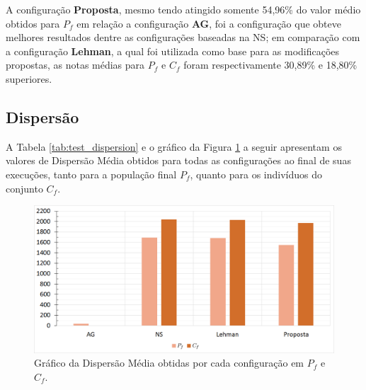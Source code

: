 A configuração \textbf{Proposta}, mesmo tendo atingido somente 54,96\% do valor médio obtidos para $P_f$ em relação a configuração \textbf{AG}, foi a configuração que obteve melhores resultados dentre as configurações baseadas na NS; em comparação com a configuração \textbf{Lehman}, a qual foi utilizada como base para as modificações propostas, as notas médias para $P_f$ e $C_f$ foram respectivamente 30,89\% e 18,80\% superiores.

\subsection{Dispersão}
\label{metrica_dispersao}

A Tabela \ref{tab:test_dispersion} e o gráfico da Figura \ref{fig:test_dispersion} a seguir apresentam os valores de Dispersão Média obtidos para todas as configurações ao final de suas execuções, tanto para a população final $P_f$, quanto para os indivíduos do conjunto $C_f$.

\begin{table}[htb]
\centering
\caption{Valores obtidos por cada configuração para Dispersão Média em $P_f$ e $C_f$.}
\label{tab:test_dispersion}
\end{table}

\begin{figure}[htb]
	\begin{center}
		\includegraphics[width=1\textwidth]{Imagens/test_dispersion.png}
		\caption{Gráfico da Dispersão Média obtidas por cada configuração em $P_f$ e $C_f$.}
		\label{fig:test_dispersion}
	\end{center}
\end{figure}

